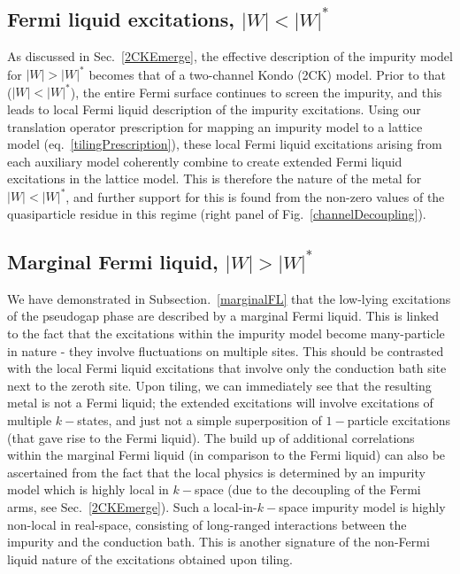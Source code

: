 \documentclass[reprint,hidelinks,onecolumn]{revtex4-2}
\begin{document}
\subsection{Fermi liquid excitations, \(|W| < |W|^*\)}
As discussed in Sec.~\ref{2CKEmerge}, the effective description of the impurity model for \(|W| > |W|^*\) becomes that of a two-channel Kondo (2CK) model. Prior to that (\(|W| < |W|^*\)), the entire Fermi surface continues to screen the impurity, and this leads to local Fermi liquid description of the impurity excitations. Using our translation operator prescription for mapping an impurity model to a lattice model (eq.~\ref{tilingPrescription}), these local Fermi liquid excitations arising from each auxiliary model coherently combine to create extended Fermi liquid excitations in the lattice model. This is therefore the nature of the metal for \(|W| < |W|^*\), and further support for this is found from the non-zero values of the quasiparticle residue in this regime (right panel of Fig.~\ref{channelDecoupling}).

\subsection{Marginal Fermi liquid, \(|W| > |W|^*\)}
We have demonstrated in Subsection.~\ref{marginalFL} that the low-lying excitations of the pseudogap phase are described by a marginal Fermi liquid. This is linked to the fact that the excitations within the impurity model become many-particle in nature - they involve fluctuations on multiple sites. This should be contrasted with the local Fermi liquid excitations that involve only the conduction bath site next to the zeroth site. Upon tiling, we can immediately see that the resulting metal is not a Fermi liquid; the extended excitations will involve excitations of multiple \(k-\)states, and just not a simple superposition of \(1-\)particle excitations (that gave rise to the Fermi liquid). The build up of additional correlations within the marginal Fermi liquid (in comparison to the Fermi liquid) can also be ascertained from the fact that the local physics is determined by an impurity model which is highly local in \(k-\)space (due to the decoupling of the Fermi arms, see Sec.~\ref{2CKEmerge}). Such a local-in-\(k-\)space impurity model is highly non-local in real-space, consisting of long-ranged interactions between the impurity and the conduction bath. This is another signature of the non-Fermi liquid nature of the excitations obtained upon tiling.
\end{document}
